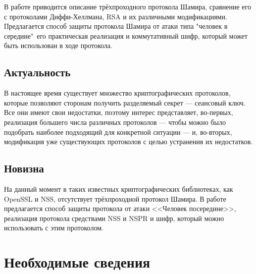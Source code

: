 



\usepackage{csquotes}        %
\usepackage[
]{biblatex}





\Intro

В работе приводится описание трёхпроходного протокола Шамира, сравнение его с протоколами Диффи-Хеллмана, RSA и их различными модификациями. Предлагается способ защиты протокола Шамира от атаки типа "человек в середине"\, его практическая реализация и коммутативный шифр, который может быть использован в ходе протокола. 
\subsection*{Актуальность}
В настоящее время существует множество криптографических протоколов, которые позволяют сторонам получить разделяемый секрет --- сеансовый ключ. Все они имеют свои недостатки, поэтому интерес представляет, во-первых, реализация большего числа различных протоколов --- чтобы можно было подобрать наиболее подходящий для конкретной ситуации --- и, во-вторых, модификация уже существующих протоколов с целью устранения их недостатков.
\subsection*{Новизна}
На данный момент в таких известных криптографических библиотеках, как OpenSSL и NSS, отсутствует трёхпроходной протокол Шамира. В работе предлагается способ защиты протокола от атаки <<Человек посередине>>, реализация протокола средствами NSS и NSPR и шифр, который можно использовать с этим протоколом.


\section{Необходимые сведения}


